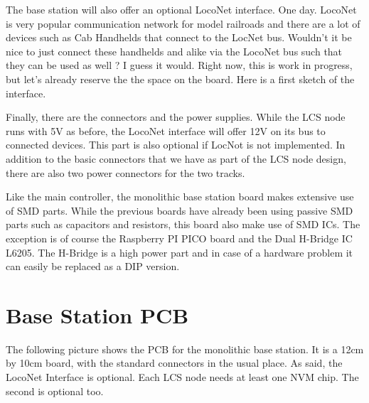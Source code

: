 The base station will also offer an optional LocoNet interface. One day. LocoNet is very popular communication network for model railroads and there are a lot of devices such as Cab Handhelds that connect to the LocNet bus. Wouldn't it be nice to just connect these handhelds and alike via the LocoNet bus such that they can be used as well ? I guess it would. Right now, this is work in progress, but let's already reserve the the space on the board. Here is a first sketch of the interface.


Finally, there are the connectors and the power supplies. While the LCS node runs with 5V as before, the LocoNet interface will offer 12V on its bus to connected devices. This part is also optional if LocNot is not implemented. In addition to the basic connectors that we have as part of the LCS node design, there are also two power connectors for the two tracks.


Like the main controller, the monolithic base station board makes extensive use of SMD parts. While the previous boards have already been using passive SMD parts such as capacitors and resistors, this board also make use of SMD ICs. The exception is of course the Raspberry PI PICO board and the Dual H-Bridge IC L6205. The H-Bridge is a high power part and in case of a hardware problem it can easily be replaced as a DIP version.

\section{Base Station PCB}

The following picture shows the PCB for the monolithic base station. It is a 12cm by 10cm board, with the standard connectors in the usual place. As said, the LocoNet Interface is optional. Each LCS node needs at least one NVM chip. The second is optional too.

